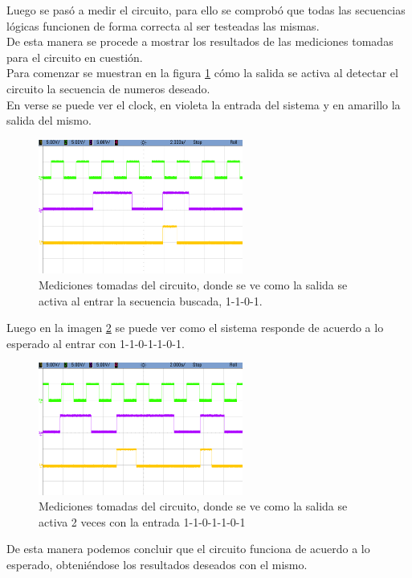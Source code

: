 %
Luego se pasó a medir el circuito, para ello se comprobó que todas las secuencias lógicas funcionen de forma correcta al ser testeadas las mismas.\\
De esta manera se procede a mostrar los resultados de las mediciones tomadas para el circuito en cuestión.\\
Para comenzar se muestran en la figura \ref{ej2_resultados1} cómo la salida se activa al detectar el circuito la secuencia de numeros deseado.\\
En verse se puede ver el clock, en violeta la entrada del sistema y en amarillo la salida del mismo.
%
\begin{figure}[H]
    \centering
    \includegraphics[width=0.6\textwidth]{figs/Ej2/scope_14.png} %
    \caption{Mediciones tomadas del circuito, donde se ve como la salida se activa al entrar la secuencia buscada, 1-1-0-1.}
    \label{ej2_resultados1}
\end{figure}
%
Luego en la imagen \ref{ej2_resultados2} se puede ver como el sistema responde de acuerdo a lo esperado al entrar con 1-1-0-1-1-0-1.

%
\begin{figure}[H]
    \centering
    \includegraphics[width=0.6\textwidth]{figs/Ej2/scope_155.png} %
    \caption{Mediciones tomadas del circuito, donde se ve como la salida se activa 2 veces con la entrada 1-1-0-1-1-0-1}
    \label{ej2_resultados2}
\end{figure}
%
De esta manera podemos concluir que el circuito funciona de acuerdo a lo esperado, obteniéndose los resultados deseados con el mismo.